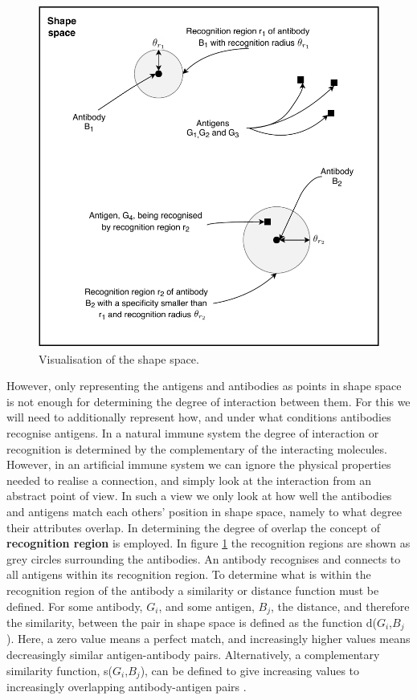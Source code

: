 
\begin{figure}
    \centering
    \includegraphics[width=0.7\columnwidth]{figs/ShapeSpace.pdf}
    \caption{Visualisation of the shape space.}
    \label{fig:shape-space}
\end{figure}

However, only representing the antigens and antibodies as points in shape space is not enough for determining the degree of interaction between them. For this we will need to additionally represent how, and under what conditions antibodies recognise antigens. In a natural immune system the degree of interaction or recognition is determined by the complementary of the interacting molecules. However, in an artificial immune system we can ignore the physical properties needed to realise a connection, and simply look at the interaction from an abstract point of view. In such a view we only look at how well the antibodies and antigens match each others' position in shape space, namely to what degree their attributes overlap. In determining the degree of overlap the concept of \textbf{recognition region} is employed. In figure \ref{fig:shape-space} the recognition regions are shown as grey circles surrounding the antibodies. An antibody recognises and connects to all antigens within its recognition region. To determine what is within the recognition region of the antibody a similarity or distance function must be defined. For some antibody, $G_{i}$, and some antigen, $B_{j}$, the distance, and therefore the similarity, between the pair in shape space is defined as the function d($G_{i}$,$B_{j}$). Here, a zero value means a perfect match, and increasingly higher values means decreasingly similar antigen-antibody pairs. Alternatively, a complementary similarity function, s($G_{i}$,$B_{j}$), can be defined to give increasing values to increasingly overlapping antibody-antigen pairs \cite{floreano2008bio}.

